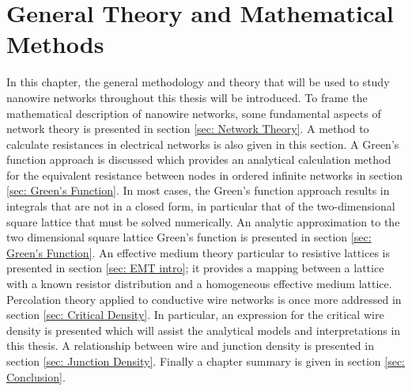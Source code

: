 \chapter{General Theory and Mathematical Methods}
In this chapter, the general methodology and theory that will be used to study nanowire networks throughout this thesis will be introduced. To frame the mathematical description of nanowire networks, some fundamental aspects of network theory is presented in section \ref{sec: Network Theory}. A method to calculate resistances in electrical networks is also given in this section. A Green's function approach is discussed which provides an analytical calculation method for the equivalent resistance between nodes in ordered infinite networks in section \ref{sec: Green's Function}. In most cases, the Green's function approach results in integrals that are not in a closed form, in particular that of the two-dimensional square lattice that must be solved numerically. An analytic approximation to the two dimensional square lattice Green's function is presented in section \ref{sec: Green's Function}. An effective medium theory particular to resistive lattices is presented in section \ref{sec: EMT intro}; it provides a mapping between a lattice with a known resistor distribution and a homogeneous effective medium lattice. Percolation theory applied to conductive wire networks is once more addressed in section \ref{sec: Critical Density}. In particular, an expression for the critical wire density is presented which will assist the analytical models and interpretations in this thesis. A relationship between wire and junction density is presented in section \ref{sec: Junction Density}. Finally a chapter summary is given in section \ref{sec: Conclusion}.  

